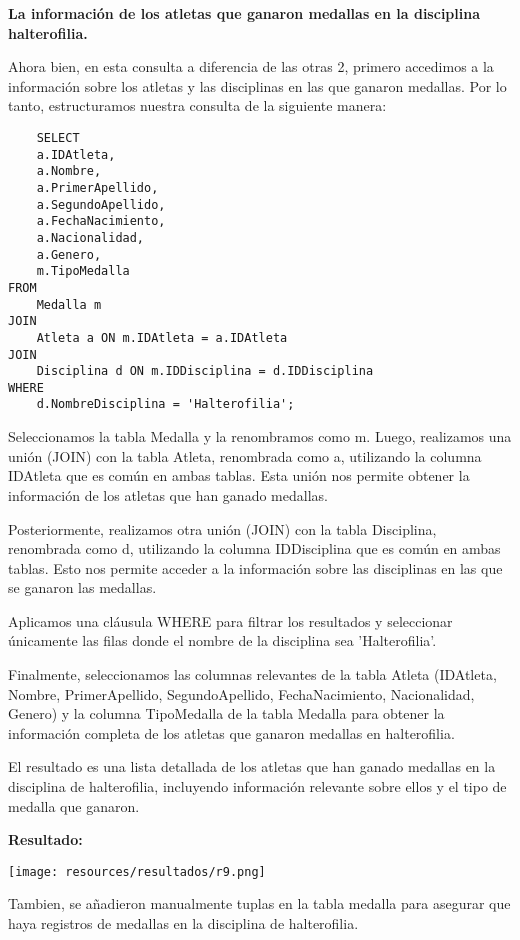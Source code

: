 \textbf{La información de los atletas que ganaron medallas en la disciplina halterofilia.}\vspace{.3cm}

Ahora bien, en esta consulta a diferencia de las otras 2, primero accedimos a la información sobre los atletas y las disciplinas en las que ganaron medallas. Por lo tanto, estructuramos nuestra consulta de la siguiente manera: \vspace{.3cm}

\begin{lstlisting}
    SELECT 
    a.IDAtleta,
    a.Nombre,
    a.PrimerApellido,
    a.SegundoApellido,
    a.FechaNacimiento,
    a.Nacionalidad,
    a.Genero,
    m.TipoMedalla
FROM 
    Medalla m
JOIN 
    Atleta a ON m.IDAtleta = a.IDAtleta
JOIN 
    Disciplina d ON m.IDDisciplina = d.IDDisciplina
WHERE 
    d.NombreDisciplina = 'Halterofilia';
\end{lstlisting}

\vspace{.3cm}

Seleccionamos la tabla Medalla y la renombramos como m. Luego, realizamos una unión (JOIN) con la tabla Atleta, renombrada como a, utilizando la columna IDAtleta que es común en ambas tablas. Esta unión nos permite obtener la información de los atletas que han ganado medallas. \vspace{.3cm}

Posteriormente, realizamos otra unión (JOIN) con la tabla Disciplina, renombrada como d, utilizando la columna IDDisciplina que es común en ambas tablas. Esto nos permite acceder a la información sobre las disciplinas en las que se ganaron las medallas.

Aplicamos una cláusula WHERE para filtrar los resultados y seleccionar únicamente las filas donde el nombre de la disciplina sea 'Halterofilia'.

Finalmente, seleccionamos las columnas relevantes de la tabla Atleta (IDAtleta, Nombre, PrimerApellido, SegundoApellido, FechaNacimiento, Nacionalidad, Genero) y la columna TipoMedalla de la tabla Medalla para obtener la información completa de los atletas que ganaron medallas en halterofilia. \vspace{.3cm}

El resultado es una lista detallada de los atletas que han ganado medallas en la disciplina de halterofilia, incluyendo información relevante sobre ellos y el tipo de medalla que ganaron. \vspace{.3cm}

\textbf{Resultado:}
\begin{center}
    \texttt{[image: resources/resultados/r9.png]}
\end{center}   

Tambien, se añadieron manualmente tuplas en la tabla medalla para asegurar que haya registros de medallas en la disciplina de halterofilia. \vspace{.3cm}
